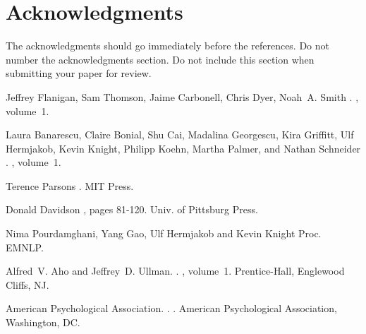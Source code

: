 \documentclass[11pt]{article}
\begin{document}
\section*{Acknowledgments}

The acknowledgments should go immediately before the references.  Do
not number the acknowledgments section. Do not include this section
when submitting your paper for review.

%
%

\begin{thebibliography}{}

Jeffrey Flanigan, Sam Thomson, Jaime Carbonell, Chris Dyer, Noah~A. Smith
.
, volume~1.

Laura Banarescu, Claire Bonial, Shu Cai, Madalina Georgescu, Kira Griffitt, Ulf Hermjakob, Kevin Knight, Philipp Koehn, Martha Palmer, and Nathan Schneider
.
, volume~1.

Terence Parsons
.
\newblock MIT Press.

Donald Davidson
, pages 81-120.
\newblock Univ. of Pittsburg Press.

Nima Pourdamghani, Yang Gao, Ulf Hermjakob and Kevin Knight
\newblock Proc. EMNLP.

Alfred~V. Aho and Jeffrey~D. Ullman.
.
, volume~1.
\newblock Prentice-{Hall}, Englewood Cliffs, NJ.

{American Psychological Association}.
.
.
\newblock American Psychological Association, Washington, DC.


\end{thebibliography}
\end{document}
